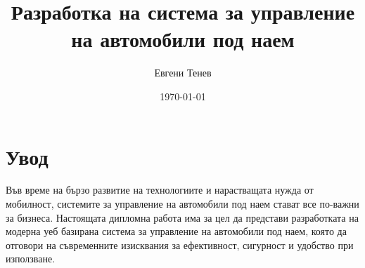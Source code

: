 \documentclass[12pt,a4paper]{article}
\title{Разработка на система за управление на автомобили под наем}
\author{Евгени Тенев}
\date{\today}
\begin{document}
\maketitle

\tableofcontents

\section{Увод}
Във време на бързо развитие на технологиите и нарастващата нужда от мобилност, системите за управление на автомобили под наем стават все по-важни за бизнеса. Настоящата дипломна работа има за цел да представи разработката на модерна уеб базирана система за управление на автомобили под наем, която да отговори на съвременните изисквания за ефективност, сигурност и удобство при използване.
\end{document}
